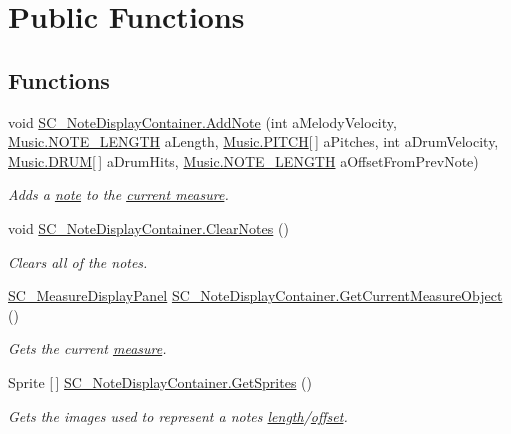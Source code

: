 \hypertarget{group___s_c___n_d_c_pub_func}{}\section{Public Functions}
\label{group___s_c___n_d_c_pub_func}
\subsection*{Functions}
\begin{DoxyCompactItemize}
\item 
void \hyperlink{group___s_c___n_d_c_pub_func_ga43e58800daae0e46bbe1b86d78c2f677}{S\+C\+\_\+\+Note\+Display\+Container.\+Add\+Note} (int a\+Melody\+Velocity, \hyperlink{group___music_enums_gaf11b5f079adbb21c800b9eca1c5c3cbd}{Music.\+N\+O\+T\+E\+\_\+\+L\+E\+N\+G\+TH} a\+Length, \hyperlink{group___music_enums_ga508f69b199ea518f935486c990edac1d}{Music.\+P\+I\+T\+CH}\mbox{[}$\,$\mbox{]} a\+Pitches, int a\+Drum\+Velocity, \hyperlink{group___music_enums_gade475b4382c7066d1af13e7c13c029b6}{Music.\+D\+R\+UM}\mbox{[}$\,$\mbox{]} a\+Drum\+Hits, \hyperlink{group___music_enums_gaf11b5f079adbb21c800b9eca1c5c3cbd}{Music.\+N\+O\+T\+E\+\_\+\+L\+E\+N\+G\+TH} a\+Offset\+From\+Prev\+Note)
\begin{DoxyCompactList}\small\item\em Adds a \hyperlink{group___music_structs_struct_music_1_1_combined_note}{note} to the \hyperlink{group___doc_s_c___m_d_p}{current measure}. \end{DoxyCompactList}\item 
void \hyperlink{group___s_c___n_d_c_pub_func_gaa344983500e83531210ae1c4789182f3}{S\+C\+\_\+\+Note\+Display\+Container.\+Clear\+Notes} ()
\begin{DoxyCompactList}\small\item\em Clears all of the notes. \end{DoxyCompactList}\item 
\hyperlink{class_s_c___measure_display_panel}{S\+C\+\_\+\+Measure\+Display\+Panel} \hyperlink{group___s_c___n_d_c_pub_func_ga526a610a4462b164cc91ae7155803ba1}{S\+C\+\_\+\+Note\+Display\+Container.\+Get\+Current\+Measure\+Object} ()
\begin{DoxyCompactList}\small\item\em Gets the current \hyperlink{group___doc_s_c___m_d_p}{measure}. \end{DoxyCompactList}\item 
Sprite \mbox{[}$\,$\mbox{]} \hyperlink{group___s_c___n_d_c_pub_func_ga3cdbb1068cd6511112c564fc636c56ca}{S\+C\+\_\+\+Note\+Display\+Container.\+Get\+Sprites} ()
\begin{DoxyCompactList}\small\item\em Gets the images used to represent a note\textquotesingle{}s \hyperlink{group___music_structs_ac35cd02f5b3c00e3040b51e40e9e6c94}{length}/\hyperlink{group___music_structs_ae281187907aed4c728c7981300dbebaf}{offset}. \end{DoxyCompactList}\end{DoxyCompactItemize}


